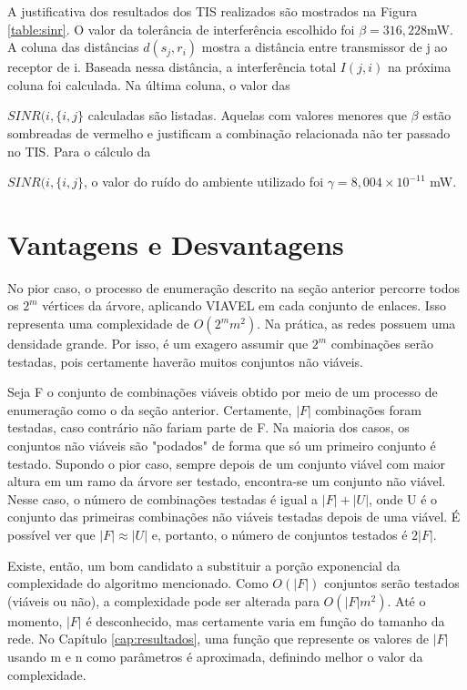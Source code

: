 A justificativa dos resultados dos TIS realizados são mostrados na Figura \ref{table:sinr}. O valor da tolerância de interferência escolhido foi $\beta=316,228$mW. A coluna das distâncias $d(s_j,r_i)$ mostra a distância entre transmissor de j ao receptor de i. Baseada nessa distância, a interferência total $I(j,i)$ na próxima coluna foi calculada. Na última coluna, o valor das {$SINR(i, \{i,j\}$  calculadas são listadas. Aquelas com valores menores que $\beta$ estão sombreadas de vermelho e justificam a combinação relacionada não ter passado no TIS. Para o cálculo da {$SINR(i, \{i,j\}$, o valor do ruído do ambiente utilizado foi $\gamma=8,004 \times 10^{-11}$ mW.


\section{Vantagens e Desvantagens}
\label{section:complexity}

No pior caso, o processo de enumeração descrito na seção anterior percorre todos os $2^m$ vértices da árvore, aplicando VIAVEL em cada conjunto de enlaces. Isso representa uma complexidade de $O(2^mm^2)$. Na prática, as redes possuem uma densidade grande. Por isso, é um exagero assumir que $2^m$ combinações serão testadas, pois certamente haverão muitos conjuntos não viáveis. 

Seja F o conjunto de combinações viáveis obtido por meio de um processo de enumeração como o da seção anterior. Certamente, $|F|$ combinações foram testadas, caso contrário não fariam parte de F. Na maioria dos casos, os conjuntos não viáveis são "podados" de forma que só um primeiro conjunto é testado. Supondo o pior caso, sempre depois de um conjunto viável com maior altura em um ramo da árvore ser testado, encontra-se um conjunto não viável. Nesse caso, o número de combinações testadas é igual a $|F| + |U|$, onde U é o conjunto das primeiras combinações não viáveis testadas depois de uma viável. É possível ver que $|F| \approx |U|$ e, portanto, o número de conjuntos testados é $2|F|$. 

Existe, então, um bom candidato a substituir a porção exponencial da complexidade do algoritmo mencionado. Como $O(|F|)$ conjuntos serão testados (viáveis ou não), a complexidade pode ser alterada para $O(|F|m^2)$. Até o momento, $|F|$ é desconhecido, mas certamente varia em função do tamanho da rede. No Capítulo \ref{cap:resultados}, uma função que represente os valores de $|F|$ usando m e n como parâmetros é aproximada, definindo melhor o valor da complexidade.

}}
